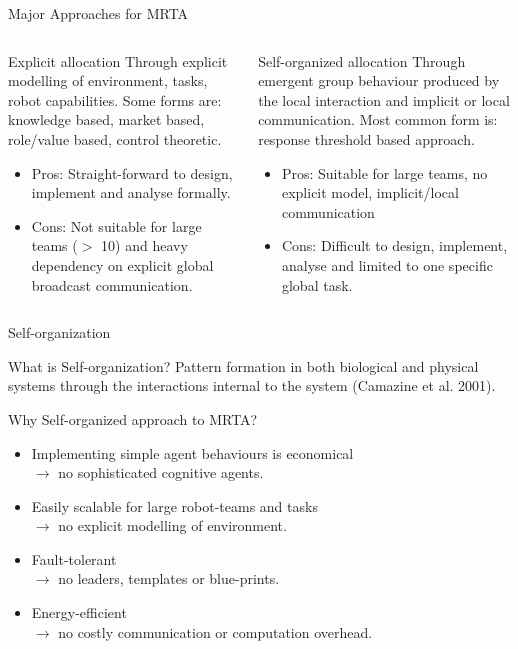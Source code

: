 \documentclass{beamer}
\begin{document}
\begin{frame}[t]{Major Approaches for MRTA}
 \begin{columns}
\begin{block}{Explicit allocation}
Through \alert{explicit modelling} of environment, tasks, robot capabilities. Some forms are: knowledge based, market based, role/value based, control theoretic. 
\begin{itemize}
\item \small Pros: Straight-forward to design, implement and analyse formally. %
\item \small Cons: \alert{Not suitable for large teams ($>$ 10) and heavy dependency on explicit global broadcast communication.}
\end{itemize}
\end{block}
\begin{block}{Self-organized allocation}
Through \alert{emergent group behaviour} produced by the local interaction and implicit or local communication. Most common form is: response threshold based approach.
\begin{itemize}
\item \small Pros: Suitable for large teams, no explicit model, implicit/local communication
\item \small Cons: \alert{Difficult to design, implement, analyse and limited to one specific global task.} %
\end{itemize}
\end{block}
\end{columns}
\end{frame}
\begin{frame}[t]{Self-organization}
\begin{block}{What is Self-organization?}
Pattern formation in both biological and physical systems through the interactions internal to the system (Camazine et al. 2001).%
\end{block}
\begin{block}{Why Self-organized approach to MRTA?}
\begin{itemize}
\item \normalsize \alert{Implementing simple agent behaviours is economical}\\
$\rightarrow$ \small no sophisticated cognitive agents.
\item \normalsize \alert{Easily scalable for large robot-teams and tasks}\\  
$\rightarrow$ \small no explicit modelling of environment.
\item \normalsize \alert{Fault-tolerant}\\ 
$\rightarrow$ \small no leaders, templates or blue-prints.
\item \normalsize \alert{Energy-efficient}\\
$\rightarrow$ \small no costly communication or computation overhead.
\end{itemize}
\end{block}
\end{frame}
\end{document}
